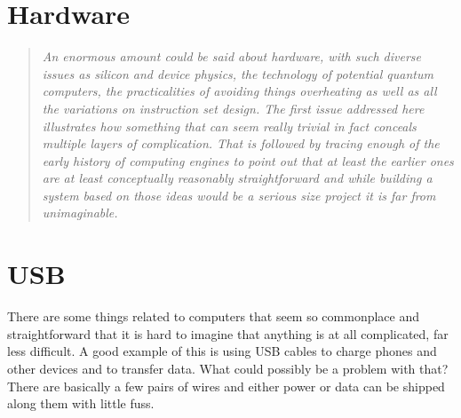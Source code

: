 \section{Hardware}
\begin{quotation}\textit{
An enormous amount could be said about hardware, with such diverse issues
as silicon and device physics, the technology of potential quantum computers,
the practicalities of avoiding things overheating as well as all the
variations on instruction set design. The first issue addressed here
illustrates how something that can seem really trivial in fact conceals
multiple layers of complication. That is followed by tracing enough of the
early history of computing engines to point out that at least the earlier
ones are at least conceptually reasonably straightforward and while
building a system based on those ideas would be a serious size project
it is far from unimaginable.
}\end{quotation}
\section{USB}
There are some things related to computers that seem so commonplace and
straightforward that it is hard to imagine that anything is at all complicated,
far less difficult. A good example of this is using USB cables to charge
phones and other devices and to transfer data. What could possibly be
a problem with that? There are basically a few pairs of wires and either
power or data can be shipped along them with little fuss.

